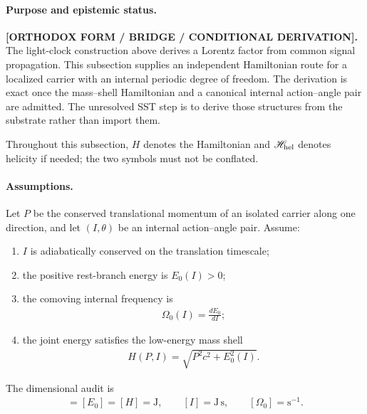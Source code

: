 \paragraph{Purpose and epistemic status.}
\textbf{[ORTHODOX FORM / BRIDGE / CONDITIONAL DERIVATION].}
The light-clock construction above derives a Lorentz factor from common signal
propagation.  This subsection supplies an independent Hamiltonian route for a
localized carrier with an internal periodic degree of freedom.  The derivation
is exact once the mass--shell Hamiltonian and a canonical internal action--angle
pair are admitted.  The unresolved SST step is to derive those structures from
the substrate rather than import them.

Throughout this subsection, \(H\) denotes the Hamiltonian and
\(\mathscr H_{\rm hel}\) denotes helicity if needed; the two symbols must not be
conflated.

\paragraph{Assumptions.}
Let \(P\) be the conserved translational momentum of an isolated carrier along
one direction, and let \((I,\theta)\) be an internal action--angle pair.  Assume:
\begin{enumerate}
    \item \(I\) is adiabatically conserved on the translation timescale;
    \item the positive rest-branch energy is \(E_0(I)>0\);
    \item the comoving internal frequency is
    \begin{align}
        \Omega_0(I)
        =
        \frac{dE_0}{dI};
        \label{eq:rt_action_phase_rest_frequency}
    \end{align}
    \item the joint energy satisfies the low-energy mass shell
    \begin{align}
        \boxed{
        H(P,I)
        =
        \sqrt{P^2c^2+E_0^2(I)}
        }.
        \label{eq:rt_action_phase_mass_shell_hamiltonian}
    \end{align}
\end{enumerate}
The dimensional audit is
\begin{align}
    [Pc]=[E_0]=[H]=\mathrm{J},
    \qquad
    [I]=\mathrm{J\,s},
    \qquad
    [\Omega_0]=\mathrm{s^{-1}}.
\end{align}

